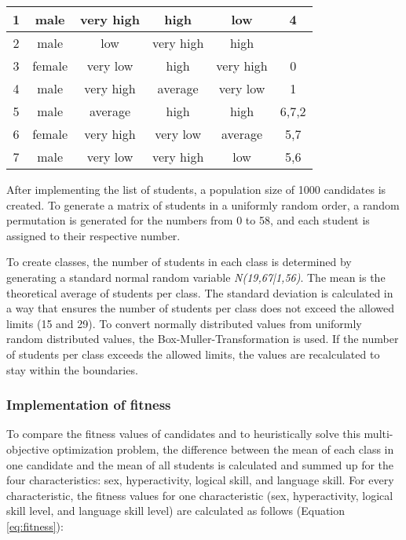 \begin{onehalfspace}
\begin{table} [H]
\begin{tabular}{c|c|c|c|c|c}
        1 &  male & very high & high & low & 4   \\ \hline 
        
        2 &  male & low & very high &  high &    \\ \hline 
        
        3 &  female & very low & high & very high & 0   \\ \hline 
        
        4 &  male & very high & average & very low & 1   \\ \hline  

        5 &  male & average & high & high & 6,7,2   \\ \hline
        
        6 &  female & very high & very low & average & 5,7   \\ \hline
        
        7 &  male & very low &very high & low & 5,6   \\ \hline
        
        
    \end{tabular}
\end{table}
After implementing the list of students,  a population size of 1000 candidates is created. To generate a matrix of students in a uniformly random order, a random permutation is generated for the numbers from 0 to 58, and each student is assigned to their respective number. 


To create classes, the number of students in each class is determined by generating a standard normal random variable \textit{N(19,67|1,56)}. The mean is the theoretical average of students per class. The standard deviation is calculated in a way that ensures the number of students per class does not exceed the allowed limits (15 and 29). To convert normally distributed values from uniformly random distributed values, the Box-Muller-Transformation is used. If the number of students per class exceeds the allowed limits, the values are recalculated to stay within the boundaries. 


\subsubsection{Implementation of fitness}
To compare the fitness values of candidates and to heuristically solve this multi-objective optimization problem, the difference between the mean of each class in one candidate and the mean of all students is calculated and summed up for the four characteristics: sex, hyperactivity, logical skill, and language skill. For every characteristic, the 
fitness values for one characteristic (sex, hyperactivity, logical skill level, and language skill level) are calculated as follows (Equation \ref{eq:fitness}):


\end{onehalfspace}
